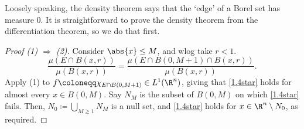\documentclass[twoside]{article}
\begin{document}
Loosely speaking, the density theorem says that the `edge' of a Borel set has measure 0. It is straightforward to prove the density theorem from the differentiation theorem, so we do that first.
\begin{proof}[Proof (1) $\Rightarrow$ (2)]
    Consider $\abs{x} \leq M$, and wlog take $r < 1$.
    \begin{equation*}
        \frac{\mu(E \cap B(x, r))}{\mu(B(x, r))} = \frac{\mu(E \cap B(0, M+1) \cap B(x, r))}{\mu(B(x, r))}.
    \end{equation*}
    Apply (1) to $f \coloneqq \chi_{E \cap B(0, M+1)} \in L^1(\R^n)$, giving that \eqref{1.4star} holds for almost every $x \in B(0, M)$.
    Say $N_M$ is the subset of $B(0,M)$ on which \eqref{1.4star} fails.
    Then, $N_0 \coloneqq \bigcup_{M \geq 1} N_M$ is a null set, and \eqref{1.4star} holds for $x \in \R^n \setminus N_0$, as required.
\end{proof}
\color{gray}
\end{document}
